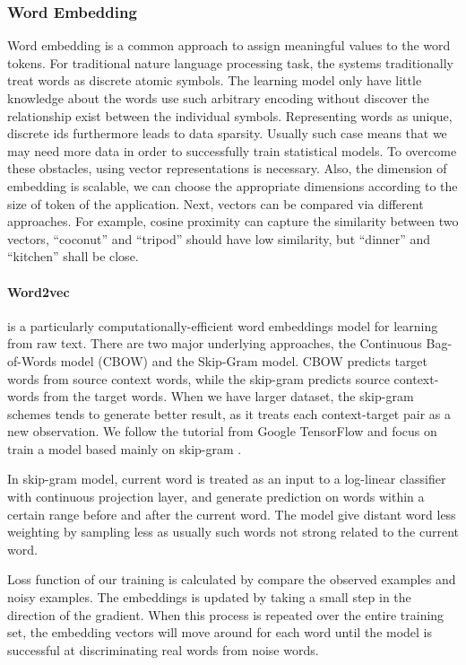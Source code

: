 \documentclass[11pt]{article}
\begin{document}
\subsubsection{Word Embedding}

Word embedding is a common approach to assign meaningful values to the word tokens. For traditional nature language processing task, the systems traditionally treat words as discrete atomic symbols. The learning model only have little knowledge about the words use such arbitrary encoding without discover the relationship exist between the individual symbols. Representing words as unique, discrete ids furthermore leads to data sparsity. Usually such case means that we may need more data in order to successfully train statistical models. To overcome these obstacles, using vector representations is necessary. Also, the dimension of embedding is scalable, we can choose the appropriate dimensions according to the size of token of the application. Next, vectors can be compared via different approaches. For example, cosine proximity can capture the similarity between two vectors, ``coconut'' and ``tripod'' should have low similarity, but ``dinner'' and ``kitchen'' shall be close.\\

\paragraph{Word2vec} \cite{mikolov2013word2vec} is a particularly computationally-efficient word embeddings model for learning from raw text. There are two major underlying approaches, the Continuous Bag-of-Words model (CBOW) and the Skip-Gram model. CBOW predicts target words from source context words, while the skip-gram predicts source context-words from the target words. When we have larger dataset, the skip-gram schemes tends to generate better result, as it treats each context-target pair as a new observation. We follow the tutorial from Google TensorFlow and focus on train a model based mainly on skip-gram \cite{word2vectutorial}.

In skip-gram model, current word is treated as an input to a log-linear classifier with continuous projection layer, and generate prediction on words within a certain range before and after the current word. The model give distant word less weighting by sampling less as usually such words not strong related to the current word.

Loss function of our training is calculated by compare the observed examples and noisy examples. The embeddings is updated by taking a small step in the direction of the gradient. When this process is repeated over the entire training set, the embedding vectors will move around for each word until the model is successful at discriminating real words from noise words.\\
\end{document}

